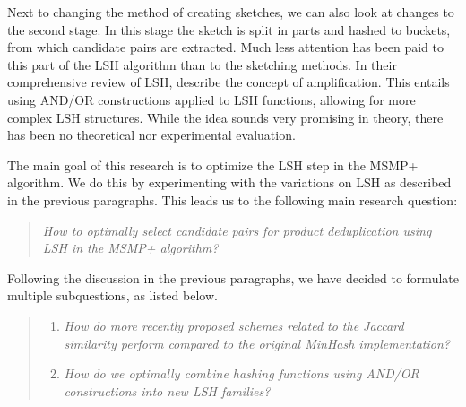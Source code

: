 Next to changing the method of creating sketches, we can also look at changes to the second stage. In this stage the sketch is split in parts and hashed to buckets, from which candidate pairs are extracted. Much less attention has been paid to this part of the LSH algorithm than to the sketching methods. In their comprehensive review of LSH, \cite{LeskovecRU14} describe the concept of amplification. This entails using AND/OR constructions applied to LSH functions, allowing for more complex LSH structures. While the idea sounds very promising in theory, there has been no theoretical nor experimental evaluation.

The main goal of this research is to optimize the LSH step in the MSMP+ algorithm. We do this by experimenting with the variations on LSH as described in the previous paragraphs. This leads us to the following main research question:
\begin{quote}
	\emph{How to optimally select candidate pairs for product deduplication using LSH in the MSMP+ algorithm?}
\end{quote}
Following the discussion in the previous paragraphs, we have decided to formulate multiple subquestions, as listed below.
\begin{quote}
	\begin{enumerate}
	\item \emph{How do more recently proposed schemes related to the Jaccard similarity perform compared to the original MinHash implementation?}
    \item \emph{How do we optimally combine hashing functions using AND/OR constructions into new LSH families?}
	\end{enumerate}
\end{quote}

